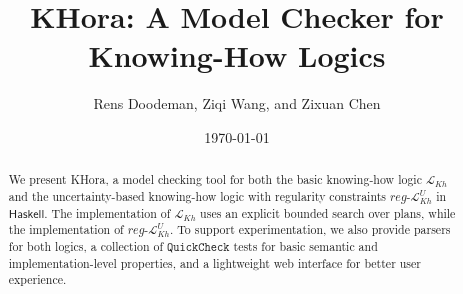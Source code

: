 \documentclass[12pt,a4paper]{article}
\title{\textsf{KHora}: A Model Checker for Knowing-How Logics}
\author{Rens Doodeman, Ziqi Wang, and Zixuan Chen}
\date{\today}
\begin{document}
\maketitle

\begin{abstract}
We present \textsf{KHora}, a model checking tool for both the basic knowing-how logic $\mathcal{L}_{Kh}$ and the uncertainty-based knowing-how logic with regularity constraints $reg\text{-}\mathcal{L}^U_{Kh}$ in $\textsf{Haskell}$. The implementation of $\mathcal{L}_{Kh}$ uses an explicit bounded search over plans, while the implementation of $reg\text{-}\mathcal{L}^U_{Kh}$. To support experimentation, we also provide parsers for both logics, a collection of $\texttt{QuickCheck}$ tests for basic semantic and implementation-level properties, and a lightweight web interface for better user experience.
\end{abstract}

\vspace{2cm} 
\tableofcontents

\clearpage


%



% 







% 







\end{document}
